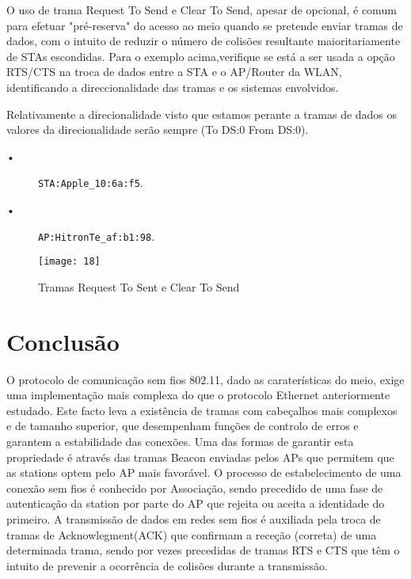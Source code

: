 \documentclass{exam}
\begin{document}
\begin{questions}
\question O uso de trama Request To Send e Clear To Send, apesar de opcional, é comum para efetuar "pré-reserva" do acesso ao meio quando se pretende enviar tramas de dados, com o intuito de reduzir o número de colisões resultante maioritariamente de STAs escondidas. Para o exemplo acima,verifique se está a ser usada a opção RTS/CTS na troca de dados entre a STA e o AP/Router da WLAN, identificando a direccionalidade das tramas e os sistemas envolvidos.
\begin{solution}
Relativamente a direcionalidade visto que estamos perante a tramas de dados os valores da direcionalidade serão sempre 
(To DS:0 From DS:0).
\begin{description}
	\item[•] \verb|STA:Apple_10:6a:f5|. 
	\item[•] \verb|AP:HitronTe_af:b1:98|.
\end{description}

\end{solution}
\begin{figure}[H]
\centering\texttt{[image: 18]} 
\caption{\label{fig:controller}Tramas Request To Sent e Clear To Send}
\end{figure}
\end{questions}

\section{Conclusão}
O protocolo de comunicação sem fios 802.11, dado as caraterísticas do meio, exige uma implementação mais complexa do que o protocolo Ethernet anteriormente estudado. Este facto leva a existência de tramas com cabeçalhos mais complexos e de tamanho superior, que desempenham funções de controlo de erros e garantem a estabilidade das conexões. Uma das formas de garantir esta propriedade  é através das tramas Beacon enviadas pelos APs que permitem que as stations optem pelo AP mais favorável. O processo de estabelecimento de uma conexão sem fios  é conhecido por Associação, sendo precedido de uma fase de autenticação da station por parte do AP que rejeita ou aceita a identidade do primeiro. A transmissão de dados em redes sem fios  é auxiliada pela troca de tramas de Acknowlegment(ACK) que confirmam a receção (correta) de uma determinada trama, sendo por vezes precedidas de tramas RTS e CTS que têm o intuito de prevenir a ocorrência de colisões durante a transmissão.
\end{document}
